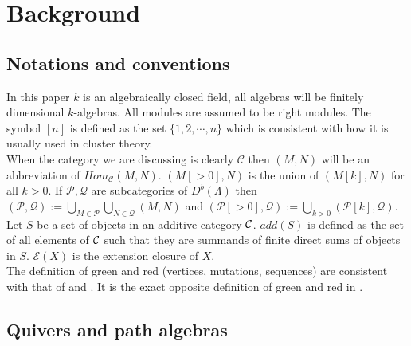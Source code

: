 \chapter{Background}\label{CB}
\section{Notations and conventions}
\indent In this paper $k$ is an algebraically closed field, all algebras will be finitely dimensional $k$-algebras. All modules are assumed to be right modules. The symbol $[n]$ is defined as the set $\{1,2,\cdots, n\}$ which is consistent with how it is usually used in cluster theory.\\
\indent When the category we are discussing is clearly $\mathcal{C}$ then $(M,N)$ will be an abbreviation of $Hom_{\mathcal{C}}(M,N)$. $(M[>0],N)$ is the union of $(M[k],N)$ for all $k>0$. If $\mathcal{P}, \mathcal{Q}$ are subcategories of $D^b(\Lambda)$ then $(\mathcal{P}, \mathcal{Q}):=\bigcup\limits_{M\in\mathcal{P}}\bigcup\limits_{N\in\mathcal{Q}}(M,N)$ and $(\mathcal{P}[>0], \mathcal{Q}):=\bigcup\limits_{k>0}(\mathcal{P}[k], \mathcal{Q})$. Let $S$ be a set of objects in an additive category $\mathcal{C}$. $add(S)$ is defined as the set of all elements of $\mathcal{C}$ such that they are summands of finite direct sums of objects in $S$. $\mathcal{E}(X)$ is the extension closure of $X$.\\
\indent The definition of green and red (vertices, mutations, sequences) are consistent with that of \cite{Kel11} and \cite{BDP13}. It is the exact opposite definition of green and red in \cite{BHIT15}.\\
\section{Quivers and path algebras}
